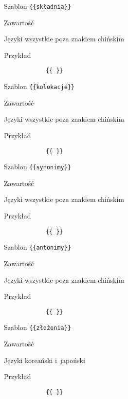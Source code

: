 \documentclass{pracamgr}
\begin{document}
\spacer
\begin{description-sub}
	\item[Szablon] \verb|{{składnia}}|
	\item[Zawartość]
	\item[Języki] wszystkie poza znakiem chińskim
	\item[Przykład]
		\begin{verbatim}
			{{ }}
		\end{verbatim}
\end{description-sub}
\spacer
\begin{description-sub}
	\item[Szablon] \verb|{{kolokacje}}|
	\item[Zawartość]
	\item[Języki] wszystkie poza znakiem chińskim
	\item[Przykład]
		\begin{verbatim}
			{{ }}
		\end{verbatim}
\end{description-sub}
\spacer
\begin{description-sub}
	\item[Szablon] \verb|{{synonimy}}|
	\item[Zawartość]
	\item[Języki] wszystkie poza znakiem chińskim
	\item[Przykład]
		\begin{verbatim}
			{{ }}
		\end{verbatim}
\end{description-sub}
\spacer
\begin{description-sub}
	\item[Szablon] \verb|{{antonimy}}|
	\item[Zawartość]
	\item[Języki] wszystkie poza znakiem chińskim
	\item[Przykład]
		\begin{verbatim}
			{{ }}
		\end{verbatim}
\end{description-sub}
\spacer
\begin{description-sub}
	\item[Szablon] \verb|{{złożenia}}|
	\item[Zawartość]
	\item[Języki] koreański i~japoński
	\item[Przykład]
		\begin{verbatim}
			{{ }}
		\end{verbatim}
\end{description-sub}
\end{document}
